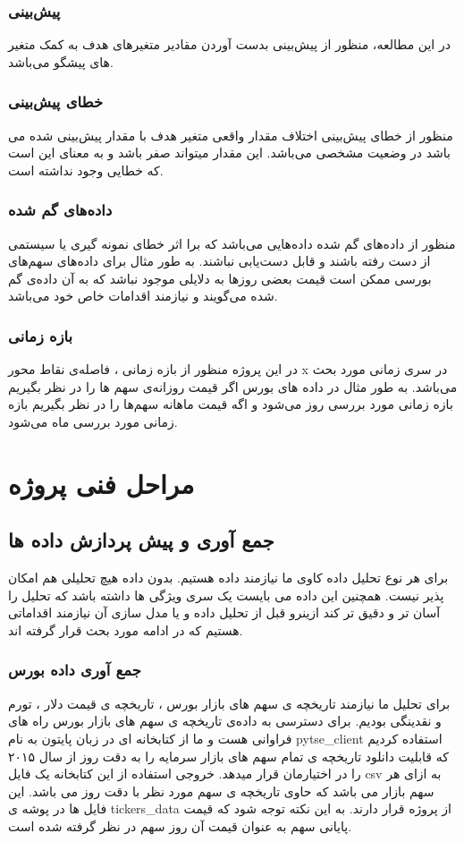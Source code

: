 \documentclass[12pt]{report}
\begin{document}
\subsection{پیش‌بینی}
در این مطالعه، منظور از پیش‌بینی بدست آوردن مقادیر متغیر‌های هدف به کمک متغیر های پیشگو می‌باشد.

\subsection{خطای پیش‌بینی}
منظور از خطای پیش‌بینی اختلاف مقدار واقعی متغیر هدف با مقدار پیش‌بینی شده می باشد در وضعیت مشخصی می‌باشد. این مقدار میتواند صفر باشد و به معنای این است که خطایی وجود نداشته است.

\subsection{داده‌های گم شده}
منظور از
داده‌های گم شده
داده‌هایی می‌باشد که برا اثر خطای نمونه گیری یا سیستمی از دست رفته باشند و قابل دست‌یابی نباشند.
به طور مثال برای داده‌های سهم‌های بورسی ممکن است قیمت بعضی روز‌ها به دلایلی موجود نباشد که به آن داده‌ی گم شده می‌گویند و نیازمند اقدامات خاص خود می‌باشد.

\subsection{بازه زمانی}
در این پروژه منظور از
بازه زمانی
، فاصله‌ی نقاط محور x در سری زمانی مورد بحث می‌باشد. به طور مثال در داده های بورس اگر قیمت روزانه‌ی سهم ها را در نظر بگیریم بازه زمانی مورد بررسی روز می‌شود و اگه قیمت ماهانه سهم‌ها را در نظر بگیریم بازه زمانی مورد بررسی ماه می‌شود.
\chapter{مراحل فنی پروژه}

\section{جمع آوری و پیش پردازش داده ها}
برای هر نوع تحلیل داده کاوی ما نیازمند داده هستیم. بدون داده هیچ تحلیلی هم امکان پذیر نیست. همچنین این داده می بایست یک سری ویژگی ها داشته باشد که تحلیل را آسان تر و دقیق تر کند ازینرو قبل از تحلیل داده و یا مدل سازی آن نیازمند اقداماتی هستیم که در ادامه مورد بحث قرار گرفته اند.
\subsection{جمع آوری داده بورس}
برای تحلیل  ما نیازمند تاریخچه ی سهم های بازار بورس ، تاریخچه ی قیمت دلار ، تورم و نقدینگی بودیم. برای دسترسی به داده‌ی تاریخچه ی سهم های بازار بورس راه های فراوانی هست و ما از کتابخانه ای در زبان پایتون به نام
pytse\_client
استفاده کردیم که قابلیت دانلود تاریخچه ی تمام سهم های بازار سرمایه را به دقت روز از سال ۲۰۱۵ را در اختیارمان قرار میدهد. خروجی استفاده از این کتابخانه یک فایل csv به ازای هر سهم بازار می باشد که حاوی تاریخچه ی سهم مورد نظر با دقت روز می باشد.
این فایل ها در پوشه ی tickers\_data از پروژه قرار دارند.
 به این نکته توجه شود که قیمت پایانی سهم به عنوان قیمت آن روز سهم در نظر گرفته شده است.
\end{document}
